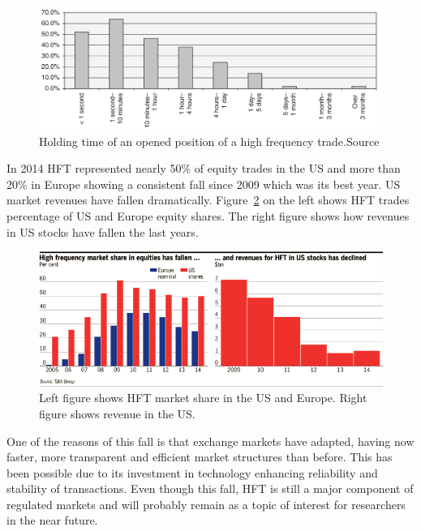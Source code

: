 \begin{figure}[!h]
  \centering
  \includegraphics[width=\textwidth]{img/HFTtradestime}
  \caption{Holding time of an opened position of a high frequency trade.Source
  \cite{aldridge2009}}
  \label{fig:HFTtimes}
\end{figure}
In 2014 HFT represented nearly 50\% of equity trades in the US and more than
20\% in Europe showing a consistent fall since 2009 which was its best year. US
market revenues have fallen dramatically.  Figure~\ref{fig:HFTmarket} on the
left shows HFT trades percentage of US and Europe equity shares. The right
figure shows how revenues in US stocks have fallen the last years.

\begin{figure}[!h]
  \centering
  \includegraphics[width=\textwidth]{img/HFTmarket}
  \caption{Left figure shows HFT market share in the US and Europe. Right figure
  shows revenue in the US.}
  \label{fig:HFTmarket}
\end{figure}
One of the reasons of this fall is that exchange markets have adapted, having
now faster, more transparent and efficient market structures than before.
This has been possible due to its investment in technology enhancing
reliability and stability of transactions. Even though this fall, HFT is still a major component of regulated markets and
will probably remain as a topic of interest for researchers in the near future.

